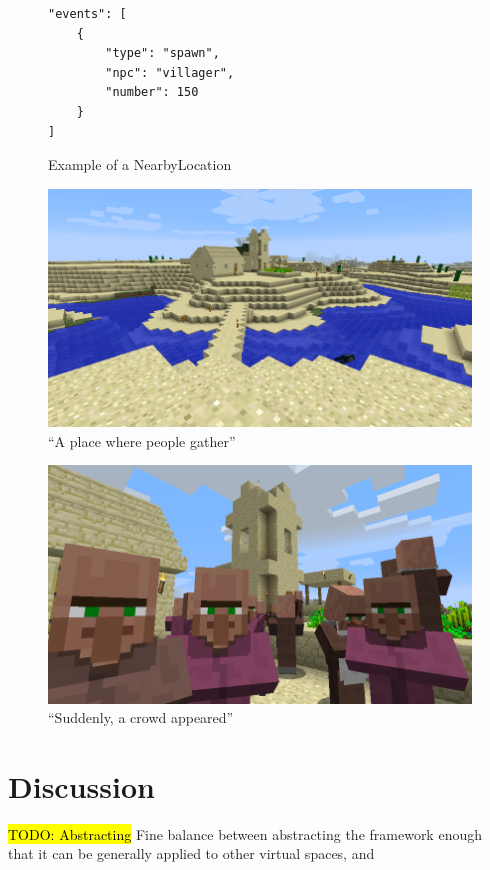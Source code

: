 \documentclass{acm}
\newcommand{\TODO}[1]{\hl{TODO: #1}}
\begin{document}
\begin{figure}
\centering
\begin{verbatim}
"events": [
    {
        "type": "spawn",
        "npc": "villager",
        "number": 150
    }
]
\end{verbatim}

\caption{Example of a NearbyLocation}
\label{figure:nearbylocation}
\end{figure}


\begin{figure}
\centering
\includegraphics[scale=.24]{./figures/place.png}
\caption{``A place where people gather''}
\label{figure:gather}
\end{figure}

\begin{figure}
\centering
\includegraphics[scale=0.24]{./figures/villagers.png}
\caption{``Suddenly, a crowd appeared''}
\label{figure:villagers}
\end{figure}


\section{Discussion}
\TODO{Abstracting}
Fine balance between abstracting the framework enough that it can be generally applied to other virtual spaces, and 
\end{document}
